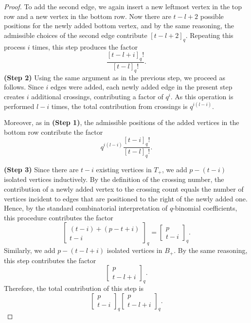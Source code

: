 \documentclass{amsart}
\newcommand{\qbinom}[2]{{\begin{bmatrix}#1\\#2\end{bmatrix}}_q}
\theoremstyle{plain}
\theoremstyle{remark}
\numberwithin{equation}{section}
\begin{document}
\begin{proof}
To add the second edge, we again insert a new leftmost vertex in the top row and a new vertex in the bottom row.
Now there are $t-l+2$ possible positions for the newly added bottom vertex, and by the same reasoning, the admissible choices of the second edge contribute $[t-l+2]_q$.
Repeating this process $i$ times, this step produces the factor
        \begin{equation} \label{factor in Step1} 
         \frac{[t-l+i]_{q}!}{[t-l]_{q}!}.
        \end{equation}
\noindent \textbf{(Step 2)} Using the same argument as in the previous step, we proceed as follows.
Since $i$ edges were added, each newly added edge in the present step creates $i$ additional crossings, contributing a factor of $q^{i}$.
As this operation is performed $l-i$ times, the total contribution from crossings is $q^{i(l-i)}$.

Moreover, as in \textbf{(Step 1)}, the admissible positions of the added vertices in the bottom row contribute the factor
    \begin{equation} \label{factor in Step2}
        q^{i(l-i)}\frac{[t-i]_{q}!}{[t-l]_{q}!}.
    \end{equation} 

\noindent \textbf{(Step 3)}  
Since there are $t-i$ existing vertices in $T_+$, we add $p-(t-i)$ isolated vertices inductively.
By the definition of the crossing number, the contribution of a newly added vertex to the crossing count equals the number of vertices incident to edges that are positioned to the right of the newly added one.
Hence, by the standard combinatorial interpretation of $q$-binomial coefficients, this procedure contributes the factor
        \begin{equation*}
            \qbinom{(t-i)+(p-t+i)}{t-i}=\qbinom{p}{t-i}.
        \end{equation*}
Similarly, we add $p-(t-l+i)$ isolated vertices in $B_+$. By the same reasoning, this step contributes the factor
        \begin{equation*}
            \qbinom{p}{t-l+i}.
        \end{equation*} 
Therefore, the total contribution of this step is
\begin{equation}  \label{factor in Step3}
\qbinom{p}{t-i}  \qbinom{p}{t-l+i}.
\end{equation} 


\end{proof}
\end{document}
